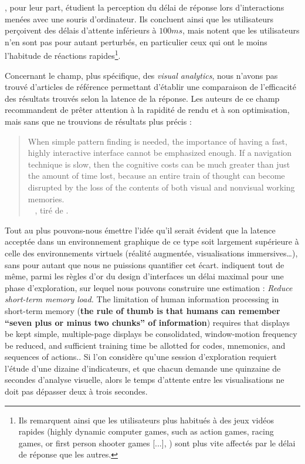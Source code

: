 		\cite{forch_are_2017}, pour leur part, étudient la perception du délai de réponse lors d'interactions menées avec une souris d'ordinateur. Ils concluent ainsi que les utilisateurs perçoivent des délais d'attente inférieurs à $100ms$, mais notent que les utilisateurs n'en sont pas pour autant perturbés, en particulier ceux qui ont le moins l'habitude de réactions rapides\footnote{
		Ils remarquent ainsi que les utilisateurs plus habitués à des jeux vidéos rapides (\og highly dynamic computer games, such as action games, racing games, or first person shooter games [...]\fg{}, \cite[51]{forch_are_2017}) sont plus vite affectés par le délai de réponse que les autres.
		}.
		
		Concernant le champ, plus spécifique, des \textit{visual analytics}, nous n'avons pas trouvé d'articles de référence permettant d'établir une comparaison de l'efficacité des résultats trouvés selon la latence de la réponse.
		Les auteurs de ce champ recommandent de prêter attention à la rapidité de rendu et à son optimisation, mais sans que ne trouvions de résultats plus précis :
		\begin{quotation}
			\og
			When simple pattern finding is needed, the importance of having a fast, highly interactive interface cannot be emphasized	enough. If a navigation technique is slow, then the cognitive costs can be much greater than just the amount of time lost, because an entire train of thought can become disrupted by the loss of the contents of both visual and nonvisual working memories.
			\fg{}\\
			\mbox{}~ \hfill  \cite{ware_information_2012}, tiré de \cite[12]{amirpour_amraii_human-data_2018}.
		\end{quotation}

		Tout au plus pouvons-nous émettre l'idée qu'il serait évident que la latence acceptée dans un environnement graphique de ce type soit largement supérieure à celle des environnements virtuels (réalité augmentée, visualisations immersives\ldots), sans pour autant que nous ne puissions quantifier cet écart.
		\cite[74]{shneiderman_designing_2004} indiquent tout de même, parmi les  règles d'or du design d'interfaces\fg{} un délai maximal pour une phase d'exploration, sur lequel nous pouvons construire une estimation : \og \textit{Reduce short-term memory load.} The limitation of human information processing in short-term memory (\textbf{the rule of thumb is that humans can remember ``seven plus or minus two chunks'' of information}) requires that displays be kept simple, multiple-page displays be consolidated, window-motion frequency be reduced, and sufficient training time be allotted for codes, mnemonics, and sequences of actions.\fg{}.
		Si l'on considère qu'une session d'exploration requiert l'étude d'une dizaine d'indicateurs, et que chacun demande une quinzaine de secondes d'analyse visuelle, alors le temps d'attente entre les visualisations ne doit pas dépasser deux à trois secondes.
	
